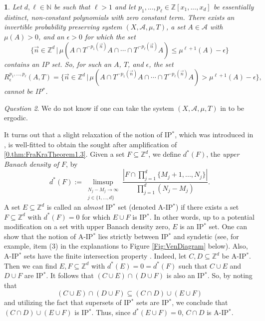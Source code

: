\documentclass[11pt,american,preprint]{elsarticle}
\numberwithin{equation}{section}
\theoremstyle{plain}
\newtheorem{thm}{\protect\theoremname}[section]
\theoremstyle{plain*}
\theoremstyle{plain}
\theoremstyle{plain*}
\theoremstyle{plain}
\theoremstyle{plain*}
\theoremstyle{remark}
\newtheorem{question}[thm]{Question}
\theoremstyle{remark*}
\theoremstyle{remark}
\theoremstyle{remark*}
\theoremstyle{remark}
\theoremstyle{remark*}
\theoremstyle{plain}
\theoremstyle{definition}
\theoremstyle{plain}
\theoremstyle{plain} %
\providecommand{\theoremname}{Theorem}
\newcommand{\N}{\mathbb{N}}
\newcommand{\Z}{\mathbb{Z}}
\begin{document}
\begin{thm}\label{0.thm:IPFailure}
Let $d,\ell\in\N$ be such that $\ell>1$ and let $p_1,...,p_\ell\in\Z[x_1,...,x_d]$ be essentially distinct, non-constant polynomials with zero constant term. There exists an  invertible probability preserving system $(X,\mathcal A,\mu,T)$, a set $A\in\mathcal A$ with $\mu(A)>0$, and an $\epsilon>0$ for which the set 
    \begin{equation}
        \{\vec n\in\Z^d\,|\,\mu(A\cap T^{-p_1(\vec n)}A\cap \cdots\cap T^{-p_\ell(\vec n)}A)\leq\mu^{\ell+1}(A)-\epsilon\}
    \end{equation}
    contains an IP set. So, for such an $A$, $T$, and $\epsilon$, the set 
    $$
R_{\epsilon}^{p_1,...,p_\ell}(A,T)=\{\vec n\in\Z^d\,|\,\mu(A\cap T^{-p_1(\vec n)}A\cap \cdots\cap T^{-p_\ell(\vec n)}A)>\mu^{\ell+1}(A)-\epsilon\},
    $$
 cannot be {\rm IP$^*$}. 
\end{thm}
\begin{question}
    We do not know if one can take the system $(X,\mathcal A,\mu,T)$ in  to be ergodic. 
\end{question}
It turns out that a slight relaxation of the notion of IP$^*$, which was introduced in \cite{AlmostIPBerLeib}, is well-fitted  to obtain the sought after amplification of \cref{0.thm:FraKraTheorem1.3}. Given a set $F\subseteq \Z^d$, we define $d^*(F)$, the \textit{upper Banach density of $F$}, by 
$$d^*(F):=\limsup_{\substack{N_j-M_j\rightarrow\infty\\ j\in\{1,...,d\}}}\frac{|F\cap\prod_{j=1}^d\{M_j+1,...,N_j\}|}{\prod_{j=1}^d(N_j-M_j)}.$$
A set $E\subseteq \Z^d$ is called an \textit{almost} IP$^*$ set (denoted A-IP$^*$) if there exists a   set $F\subseteq \Z^d$ with $d^*(F)=0$ for which $E\cup F$ is  IP$^*$. In other words, up to a potential modification on a set with upper Banach density zero, $E$ is an  IP$^*$ set. One can show that the notion of A-IP$^*$ lies strictly between IP$^*$ and syndetic \cite[p. 505]{AlmostIPBerLeib} (see, for example, item  (3)  in the explanations to Figure \ref{Fig:VenDiagram} below). Also, A-IP$^*$ sets have the finite intersection property \cite[p. 502]{AlmostIPBerLeib}. Indeed,  let $C,D\subseteq \Z^d$ be A-IP$^*$.  Then we can find $E,F\subseteq \Z^d$ with $d^*(E)=0=d^*(F)$  such that $C\cup E$ and $D\cup F$ are IP$^*$. It follows that $(C\cup E)\cap (D\cup F)$ is also an  IP$^*$. So, by noting that 
$$(C\cup E)\cap (D\cup F)\subseteq (C\cap D)\cup (E\cup F)$$
and utilizing the fact that supersets of IP$^*$ sets are IP$^*$, we conclude that $(C\cap D)\cup(E\cup F)$ is IP$^*$. Thus, since $d^*(E\cup F)=0$, $C\cap D$ is A-IP$^*$.\\
\end{document}
